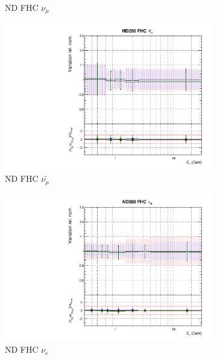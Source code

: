 \begin{figure}[!htbp]
\begin{subfigure}{0.49\textwidth}
  \caption{ND FHC $\nu_{\mu}$}
\end{subfigure}
\begin{subfigure}{0.49\textwidth}
  \centering
  \includegraphics[width=0.99\linewidth]{figs/polyasmvsflux_1}
  \caption{ND FHC $\bar{\nu_{\mu}}$}
\end{subfigure}
\begin{subfigure}{0.49\textwidth}
  \centering
  \includegraphics[width=0.99\linewidth]{figs/polyasmvsflux_2}
  \caption{ND FHC $\nu_{e}$}
\end{subfigure}
\begin{subfigure}{0.49\textwidth}
  \centering

\end{subfigure}
\end{figure}
